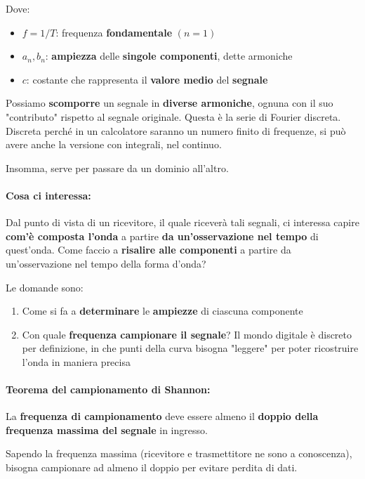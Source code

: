 Dove: 
\begin{itemize}
	\item $f=1/T$: frequenza \textbf{fondamentale} $(n=1)$
	
    \item $a_n, b_n$: \textbf{ampiezza} delle \textbf{singole componenti}, dette armoniche
	
    \item $c$: costante che rappresenta il \textbf{valore medio} del \textbf{segnale}
\end{itemize}

Possiamo \textbf{scomporre} un segnale in \textbf{diverse armoniche}, ognuna con il suo "contributo" rispetto al segnale originale. Questa è la serie di Fourier discreta. Discreta perché in un calcolatore saranno un numero finito di frequenze, si può avere anche la versione con integrali, nel continuo.

Insomma, serve per passare da un dominio all'altro.

\paragraph{Cosa ci interessa:} Dal punto di vista di un ricevitore, il quale riceverà tali segnali, ci interessa capire \textbf{com'è composta l'onda} a partire \textbf{da un'osservazione nel tempo} di quest'onda. Come faccio a \textbf{risalire alle componenti} a partire da un'osservazione nel tempo della forma d'onda? 

Le domande sono: 
\begin{enumerate}
	\item Come si fa a \textbf{determinare} le \textbf{ampiezze} di ciascuna componente
	
    \item Con quale \textbf{frequenza campionare il segnale}? Il mondo digitale è discreto per definizione, in che punti della curva bisogna "leggere" per poter ricostruire l'onda in maniera precisa
\end{enumerate}

\paragraph{Teorema del campionamento di Shannon:} La \textbf{frequenza di campionamento} deve essere almeno il \textbf{doppio della frequenza massima del segnale} in ingresso.

Sapendo la frequenza massima (ricevitore e trasmettitore ne sono a conoscenza), bisogna campionare ad almeno il doppio per evitare perdita di dati.

